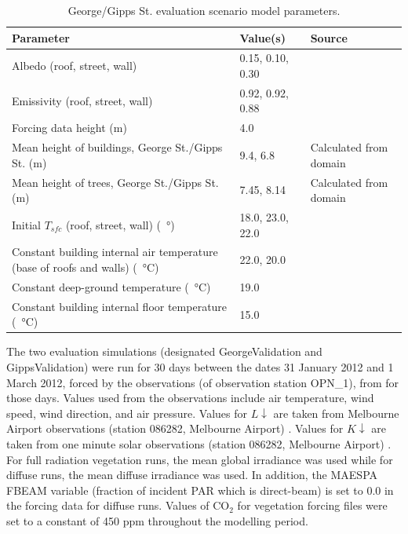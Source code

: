 \documentclass[final,3p,times,authoryear]{elsarticle}
\begin{document}
\begin{table}[!htbp]
\caption{George/Gipps St. evaluation scenario model parameters. \label{tab:modcomvalpara}}     
\begin{tabular}{| p{8.0cm} | l | l|}
\hline
\textbf{Parameter} & \textbf{Value(s)}& \textbf{Source} \\ \hline
Albedo (roof, street, wall)   & 0.15, 0.10, 0.30 & \cite{Krayenhoff2007}   \\ \hline
Emissivity (roof, street, wall)   & 0.92, 0.92, 0.88 & \cite{Krayenhoff2007}   \\ \hline
Forcing data height (m)  & 4.0 & \cite{Coutts2015}   \\ \hline
Mean height of buildings, George St./Gipps St. (m)  & 9.4, 6.8  & Calculated from domain  \\ \hline
Mean height of trees, George St./Gipps St. (m)  & 7.45, 8.14  & Calculated from domain  \\ \hline
Initial $T_{sfc}$ (roof, street, wall) (\SI{}{\degree})  & 18.0, 23.0, 22.0  & \cite{Krayenhoff2007}  \\ \hline
Constant building internal air temperature (base of roofs and walls) (\SI{}{\degreeCelsius})  & 22.0, 20.0  & \cite{Krayenhoff2007}  \\ \hline
Constant deep-ground temperature (\SI{}{\degreeCelsius})  & 19.0 & \cite{Krayenhoff2007}  \\ \hline
Constant building internal floor temperature (\SI{}{\degreeCelsius})  & 15.0 & \cite{Krayenhoff2007}  \\ \hline
\end{tabular}
\end{table}

The two evaluation simulations (designated GeorgeValidation and GippsValidation) were run for 30 days between the dates 31 January 2012 and 1 March 2012, forced by the observations (of observation station OPN\_1), from \cite{Coutts2015} for those days. Values used from the observations include air temperature, wind speed, wind direction, and air pressure. Values for $L\downarrow$ are taken from Melbourne Airport observations (station 086282, Melbourne Airport) \citep{BOM2016b}. Values for $K\downarrow$ are taken from one minute solar observations (station 086282, Melbourne Airport) \citep{BOM2016}.  For full radiation vegetation runs, the mean global irradiance was used while for diffuse runs, the mean diffuse irradiance was used. In addition, the MAESPA FBEAM variable (fraction of incident PAR which is direct-beam) is set to 0.0 in the forcing data for diffuse runs. Values of CO$_{2}$ for vegetation forcing files were set to a constant of 450 ppm throughout the modelling period.
\end{document}
